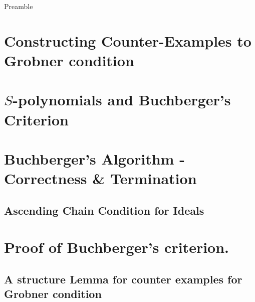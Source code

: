 \noindent
Preamble

\section{Constructing Counter-Examples to Grobner condition}

\section{$S$-polynomials and Buchberger's Criterion}

\section{Buchberger's Algorithm - Correctness \& Termination}
\subsection{Ascending Chain Condition for Ideals}

\section{Proof of Buchberger's criterion.}
\subsection{A structure Lemma for counter examples for Grobner condition}
